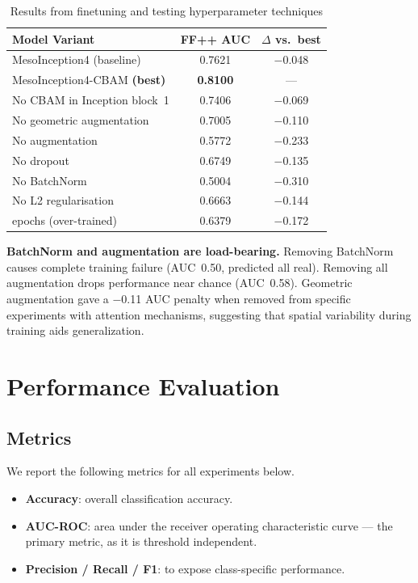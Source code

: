 \documentclass[conference]{IEEEtran}
\begin{document}
\begin{table}[h]
\centering
\caption{Results from finetuning and testing hyperparameter techniques}
\label{tab:ablation}
\begin{tabular}{lcc}
\toprule
\textbf{Model Variant} & \textbf{FF++ AUC} & \textbf{$\Delta$ vs.\ best} \\
\midrule
MesoInception4 (baseline)                  & 0.7621          & $-$0.048 \\
\midrule
MesoInception4-CBAM \textbf{(best)}        & \textbf{0.8100} & ---      \\
\quad No CBAM in Inception block~1         & 0.7406          & $-$0.069 \\
\quad No geometric augmentation            & 0.7005          & $-$0.110 \\
\quad No augmentation                      & 0.5772          & $-$0.233 \\
\quad No dropout                           & 0.6749          & $-$0.135 \\
\quad No BatchNorm                         & 0.5004          & $-$0.310 \\
\quad No L2 regularisation                 & 0.6663          & $-$0.144 \\
\quad 100 epochs (over-trained)            & 0.6379          & $-$0.172 \\
\bottomrule
\end{tabular}
\end{table}

\textbf{BatchNorm and augmentation are load-bearing.}
Removing BatchNorm causes complete training failure (AUC~0.50, predicted all
real). Removing all augmentation drops performance near chance (AUC~0.58).
Geometric augmentation gave a $-$0.11 AUC penalty when removed from specific experiments with attention mechanisms,
suggesting that spatial variability during training aids generalization.
\section{Performance Evaluation}
\label{sec:evaluation}

\subsection{Metrics}
We report the following metrics for all experiments below. 
\begin{itemize}
  \item \textbf{Accuracy}: overall classification accuracy.
  \item \textbf{AUC-ROC}: area under the receiver operating
        characteristic curve — the primary metric, as it is threshold
        independent.
  \item \textbf{Precision / Recall / F1}: to expose class-specific
        performance.
\end{itemize}
\end{document}

